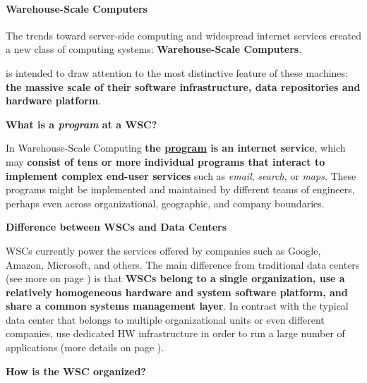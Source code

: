 \newpage

\paragraph{Warehouse-Scale Computers}

\noindent
The trends toward server-side computing and widespread internet services created a new class of computing systems: \textbf{Warehouse-Scale Computers}.

\begin{definitionbox}
     is intended to draw attention to the most distinctive feature of these machines: \textbf{the massive scale of their software infrastructure, data repositories and hardware platform}.
\end{definitionbox}

\begin{flushleft}
    \textcolor{Green3}{ \textbf{What is a \emph{program} at a WSC?}}
\end{flushleft}

\noindent
In Warehouse-Scale Computing \textbf{the \underline{program} is an internet service}, which may \textbf{consist of tens or more individual programs that interact to implement complex end-user services} such as \emph{email}, \emph{search}, or \emph{maps}. These programs might be implemented and maintained by different teams of engineers, perhaps even across organizational, geographic, and company boundaries.

\begin{flushleft}
    \textcolor{Green3}{ \textbf{Difference between WSCs and Data Centers}}
\end{flushleft}

\noindent
WSCs currently power the services offered by companies such as Google, Amazon, Microsoft, and others. The main difference from traditional data centers (see more on page \pageref{Data Center definition}) is that \textbf{WSCs belong to a single organization, use a relatively homogeneous hardware and system software platform, and share a common systems management layer}. In contrast with the typical data center that belongs to multiple organizational units or even different companies, use dedicated HW infrastructure in order to run a large number of applications (more details on page \pageref{Data Center definition}).

\begin{flushleft}
    \textcolor{Green3}{ \textbf{How is the WSC organized?}}
\end{flushleft}

